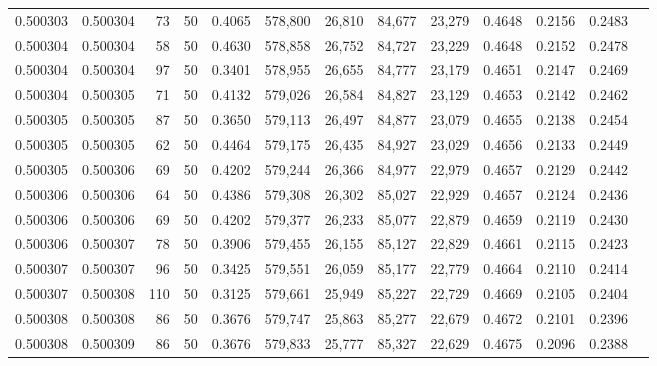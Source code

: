 \begin{tabular}{rrrrrrrrrrrrr}
0.500303 & 0.500304 &    73 &  50 &                                     0.4065 & 578,800 &  26,810 &  84,677 &  23,279 & 0.4648 & 0.2156 & 0.2483 \\
0.500304 & 0.500304 &    58 &  50 &                                     0.4630 & 578,858 &  26,752 &  84,727 &  23,229 & 0.4648 & 0.2152 & 0.2478 \\
0.500304 & 0.500304 &    97 &  50 &                                     0.3401 & 578,955 &  26,655 &  84,777 &  23,179 & 0.4651 & 0.2147 & 0.2469 \\
0.500304 & 0.500305 &    71 &  50 &                                     0.4132 & 579,026 &  26,584 &  84,827 &  23,129 & 0.4653 & 0.2142 & 0.2462 \\
0.500305 & 0.500305 &    87 &  50 &                                     0.3650 & 579,113 &  26,497 &  84,877 &  23,079 & 0.4655 & 0.2138 & 0.2454 \\
0.500305 & 0.500305 &    62 &  50 &                                     0.4464 & 579,175 &  26,435 &  84,927 &  23,029 & 0.4656 & 0.2133 & 0.2449 \\
0.500305 & 0.500306 &    69 &  50 &                                     0.4202 & 579,244 &  26,366 &  84,977 &  22,979 & 0.4657 & 0.2129 & 0.2442 \\
0.500306 & 0.500306 &    64 &  50 &                                     0.4386 & 579,308 &  26,302 &  85,027 &  22,929 & 0.4657 & 0.2124 & 0.2436 \\
0.500306 & 0.500306 &    69 &  50 &                                     0.4202 & 579,377 &  26,233 &  85,077 &  22,879 & 0.4659 & 0.2119 & 0.2430 \\
0.500306 & 0.500307 &    78 &  50 &                                     0.3906 & 579,455 &  26,155 &  85,127 &  22,829 & 0.4661 & 0.2115 & 0.2423 \\
0.500307 & 0.500307 &    96 &  50 &                                     0.3425 & 579,551 &  26,059 &  85,177 &  22,779 & 0.4664 & 0.2110 & 0.2414 \\
0.500307 & 0.500308 &   110 &  50 &                                     0.3125 & 579,661 &  25,949 &  85,227 &  22,729 & 0.4669 & 0.2105 & 0.2404 \\
0.500308 & 0.500308 &    86 &  50 &                                     0.3676 & 579,747 &  25,863 &  85,277 &  22,679 & 0.4672 & 0.2101 & 0.2396 \\
0.500308 & 0.500309 &    86 &  50 &                                     0.3676 & 579,833 &  25,777 &  85,327 &  22,629 & 0.4675 & 0.2096 & 0.2388 \\

\end{tabular}
